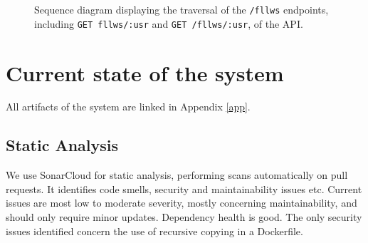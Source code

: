 \documentclass[12pt, a4paper, oneside]{book}
\begin{document}
\begin{figure}[H]
    \centering
    \caption{Sequence diagram displaying the traversal of the \texttt{/fllws} endpoints, including \texttt{GET fllws/:usr} and \texttt{GET /fllws/:usr}, of the API.}
    \label{fig:seq-diagram-follow}
\end{figure}

\newpage

\section{Current state of the system}

All artifacts of the system are linked in Appendix \ref{app}.

\subsection{Static Analysis}

We use SonarCloud for static analysis, performing scans automatically on pull requests. It identifies code smells, security and maintainability issues etc. Current issues are most low to moderate severity, mostly concerning maintainability, and should only require minor updates. Dependency health is good. The only security issues identified concern the use of recursive copying in a Dockerfile.
\end{document}
